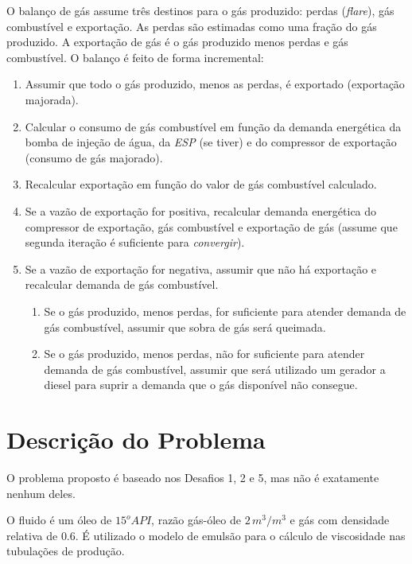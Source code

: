 \documentclass[final,5p]{elsarticle}
\numberwithin{equation}{section}
\begin{document}
        O balanço de gás assume três destinos para o gás produzido: perdas (\emph{flare}), gás combustível e exportação. As perdas são estimadas como uma fração do gás produzido. A exportação de gás é o gás produzido menos perdas e gás combustível. O balanço é feito de forma incremental:

        \begin{enumerate}
            \item Assumir que todo o gás produzido, menos as perdas, é exportado (exportação majorada).
            \item Calcular o consumo de gás combustível em função da demanda energética da bomba de injeção de água, da \emph{ESP} (se tiver) e do compressor de exportação (consumo de gás majorado).
            \item Recalcular exportação em função do valor de gás combustível calculado.
            \item Se a vazão de exportação for positiva, recalcular demanda energética do compressor de exportação, gás combustível e exportação de gás (assume que segunda iteração é suficiente para \emph{convergir}).
            \item Se a vazão de exportação for negativa, assumir que não há exportação e recalcular demanda de gás combustível.
            \begin{enumerate}
                \item Se o gás produzido, menos perdas, for suficiente para atender demanda de gás combustível, assumir que sobra de gás será queimada.
                \item Se o gás produzido, menos perdas, não for suficiente para atender demanda de gás combustível, assumir que será utilizado um gerador a diesel para suprir a demanda que o gás disponível não consegue.
            \end{enumerate}
        \end{enumerate}

    \section{Descrição do Problema}

        O problema proposto é baseado nos Desafios 1, 2 e 5, mas não é exatamente nenhum deles.

        O fluido é um óleo de $15^o API$, razão gás-óleo de $2\,m^3/m^3$ e gás com densidade relativa de $0.6$. É utilizado o modelo de emulsão para o cálculo de viscosidade nas tubulações de produção.
\end{document}
